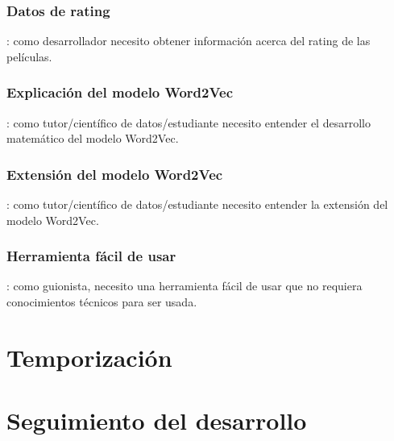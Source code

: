 \subsubsection*{Datos de rating}\label{uc:rating_data}: como desarrollador necesito obtener información acerca del rating
de las películas.

\subsubsection*{Explicación del modelo Word2Vec}\label{uc:math}: como tutor/científico de datos/estudiante
necesito entender el desarrollo matemático del modelo Word2Vec.

\subsubsection*{Extensión del modelo Word2Vec}\label{uc:math}: como tutor/científico de datos/estudiante
necesito entender la extensión del modelo Word2Vec.

\subsubsection*{Herramienta fácil de usar}\label{uc:user_friendly_tool}: como guionista, necesito una herramienta
fácil de usar que no requiera conocimientos técnicos para ser usada.

\section{Temporización}

\section{Seguimiento del desarrollo}
